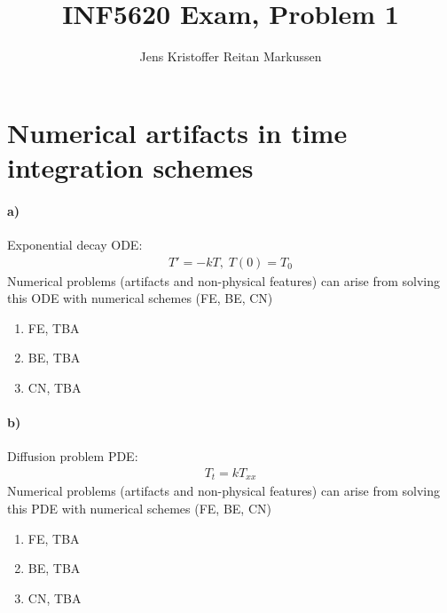 \documentclass[11pt,a4paper]{article}
\author{Jens Kristoffer Reitan Markussen}
\title{INF5620 Exam, Problem 1}
\begin{document}
\maketitle

\section*{Numerical artifacts in time integration schemes}
\paragraph*{a)}
Exponential decay ODE:
\begin{align}
T' = -kT,\; T(0) = T_0
\end{align}
Numerical problems (artifacts and non-physical features) can arise from solving this ODE with numerical schemes (FE, BE, CN)
\begin{enumerate}
\item[] FE, TBA
\item[] BE, TBA
\item[] CN, TBA
\end{enumerate}

\paragraph*{b)}
Diffusion problem PDE:
\begin{align}
T_t = kT_{xx}
\end{align}
Numerical problems (artifacts and non-physical features) can arise from solving this PDE with numerical schemes (FE, BE, CN)
\begin{enumerate}
\item[] FE, TBA
\item[] BE, TBA
\item[] CN, TBA
\end{enumerate}
\end{document}
